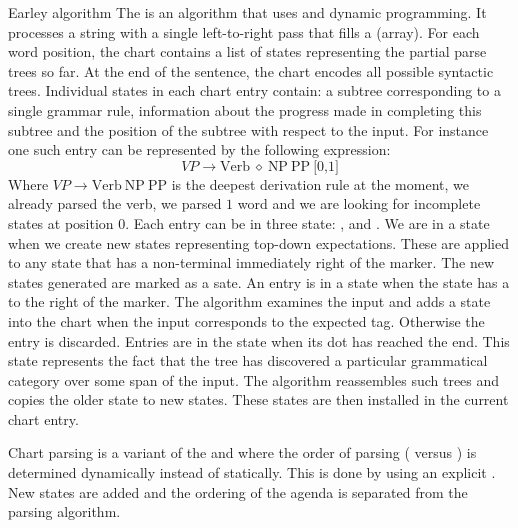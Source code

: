 \begin{df}{Earley algorithm}
The \sb{} is an algorithm that uses  and dynamic programming. It processes a string with a single left-to-right pass that fills a  (array). For each word position, the chart contains a list of states representing the partial parse trees so far. At the end of the sentence, the chart encodes all possible syntactic trees. Individual states in each chart entry contain: a subtree corresponding to a single grammar rule, information about the progress made in completing this subtree and the position of the subtree with respect to the input. For instance one such entry can be represented by the following expression:
\begin{equation}
VP\rightarrow\mbox{Verb}\ \diamond\ \mbox{NP}\ \mbox{PP}\ \mbox{[0,1]}
\end{equation}
Where $VP\rightarrow\mbox{Verb}\ \mbox{NP}\ \mbox{PP}$ is the deepest derivation rule at the moment, we already parsed the verb, we parsed $1$ word and we are looking for incomplete states at position $0$. Each entry can be in three state: ,  and . We are in a  state when we create new states representing top-down expectations. These are applied to any state that has a non-terminal immediately right of the marker. The new states generated are marked as a  sate. An entry is in a  state when the state has a  to the right of the marker. The algorithm examines the input and adds a state into the chart when the input corresponds to the expected tag. Otherwise the entry is discarded. Entries are in the  state when its dot has reached the end. This state represents the fact that the tree has discovered a particular grammatical category over some span of the input. The algorithm reassembles such trees and copies the older state to new states. These states are then installed in the current chart entry.
\end{df}
\begin{df}{Chart parsing}
\sb{} is a variant of the  and  where the order of parsing ( versus ) is determined dynamically instead of statically. This is done by using an explicit . New states are added and the ordering of the agenda is separated from the parsing algorithm.
\end{df}